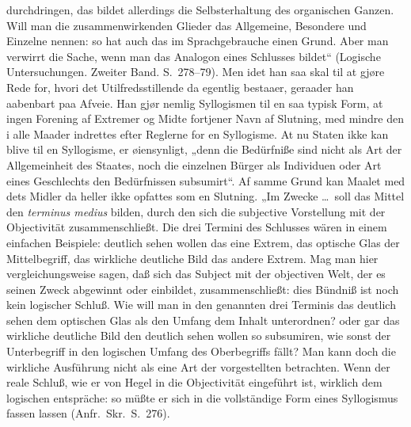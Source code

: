 \documentclass[12pt]{book}
\begin{document}
{durchdringen, das bildet allerdings die Selbsterhaltung des organischen Ganzen. Will man die zusammenwirkenden Glieder das Allgemeine, Besondere und Einzelne nennen: so hat auch das im Sprachgebrauche einen Grund. Aber man verwirrt die Sache, wenn man das Analogon eines Schlusses bildet“ (Logische Untersuchungen. Zweiter Band. S.~278--79). Men idet han saa skal til at gjøre Rede for, hvori det Utilfredsstillende da egentlig bestaaer, geraader han aabenbart paa Afveie. Han gjør nemlig Syllogismen til en saa typisk Form, at ingen Forening af Extremer og Midte fortjener Navn af Slutning, med mindre den i alle Maader indrettes efter Reglerne for en Syllogisme. At nu Staten ikke kan blive til en Syllogisme, er øiensynligt, „denn die Bedürfniße sind nicht als Art der Allgemeinheit des Staates, noch die einzelnen Bürger als Individuen oder Art eines Geschlechts den Bedürfnissen subsumirt“. Af samme Grund kan Maalet med dets Midler da heller ikke opfattes som en Slutning. „Im Zwecke \dots\ soll das Mittel den \textit{terminus medius} bilden, durch den sich die subjective Vorstellung mit der Objectivität zusammenschließt. Die drei Termini des Schlusses wären in einem einfachen Beispiele: deutlich sehen wollen das eine Extrem, das optische Glas der Mittelbegriff, das wirkliche deutliche Bild das andere Extrem. Mag man hier vergleichungsweise sagen, daß sich das Subject mit der objectiven Welt, der es seinen Zweck abgewinnt oder einbildet, zusammenschließt: dies Bündniß ist noch kein logischer Schluß. Wie will man in den genannten drei Terminis das deutlich sehen dem optischen Glas als den Umfang dem Inhalt unterordnen? oder gar das wirkliche deutliche Bild den deutlich sehen wollen so subsumiren, wie sonst der Unterbegriff in den logischen Umfang des Oberbegriffs fällt? Man kann doch die wirkliche Ausführung nicht als eine Art der vorgestellten betrachten. Wenn der reale Schluß, wie er von Hegel in die Objectivität eingeführt ist, wirklich dem logischen entspräche: so müßte er sich in die vollständige Form eines Syllogismus fassen lassen (Anfr.\ Skr.\ S.~276).}%
\end{document}
